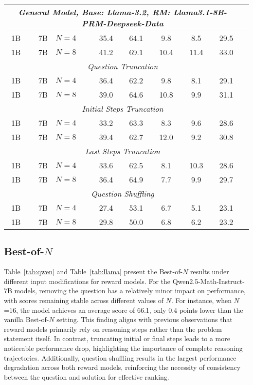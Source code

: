 \documentclass{article}
\begin{document}
\begin{table*}[!t]
\begin{center}
\begin{tabular}{crlcccccl}
\midrule
\multicolumn{8}{c}{\textit{General Model, Base: Llama-3.2, RM: Llama3.1-8B-PRM-Deepseek-Data}} \\
\midrule
 1B & 7B & $N=4$ & 35.4 & 64.1	& 9.8 & 8.5 & 29.5\\
 1B & 7B & $N=8$ & 41.2 & 69.1 & 10.4 & 11.4 & 33.0\\
\cmidrule(lr){1-8}
\multicolumn{8}{c}{\textit{Question Truncation}} \\
 1B & 7B & $N=4$ & 36.4 & 62.2	& 9.8 & 8.1 & 29.1\\
 1B & 7B & $N=8$ & 39.0 & 64.6 & 10.8 & 9.9 & 31.1\\
\multicolumn{8}{c}{\textit{Initial Steps Truncation}} \\
 1B & 7B & $N=4$ & 33.2 & 63.3	& 8.3 & 9.6 & 28.6\\
 1B & 7B & $N=8$ & 39.4 & 62.7	& 12.0 & 9.2 & 30.8\\
\multicolumn{8}{c}{\textit{Last Steps Truncation}} \\
 1B & 7B & $N=4$ & 33.6 & 62.5	& 8.1 & 10.3 & 28.6\\
 1B & 7B & $N=8$ & 36.4 & 64.9	& 7.7 & 9.9 & 29.7\\
\multicolumn{8}{c}{\textit{Question Shuffling}} \\
 1B & 7B & $N=4$ & 27.4 & 53.1 & 6.7 & 5.1 & 23.1\\
 1B & 7B & $N=8$ & 29.8 & 50.0 & 6.8 & 6.2 & 23.2\\
\bottomrule
\end{tabular}
\end{center}
\vskip -0.2in
\end{table*}

\subsection{Best-of-$N$}
Table~\ref{tab:qwen} and Table~\ref{tab:llama} present the Best-of-$N$ results under different input modifications for reward models. For the Qwen2.5-Math-Instruct-7B models, removing the question has a relatively minor impact on performance, with scores remaining stable across different values of $N$. For instance, when $N$=16, the model achieves an average score of 66.1, only 0.4 points lower than the vanilla Best-of-$N$ setting. This finding aligns with previous observations that reward models primarily rely on reasoning steps rather than the problem statement itself. In contrast, truncating initial or final steps leads to a more noticeable performance drop, highlighting the importance of complete reasoning trajectories. Additionally, question shuffling results in the largest performance degradation across both reward models, reinforcing the necessity of consistency between the question and solution for effective ranking.
\end{document}
